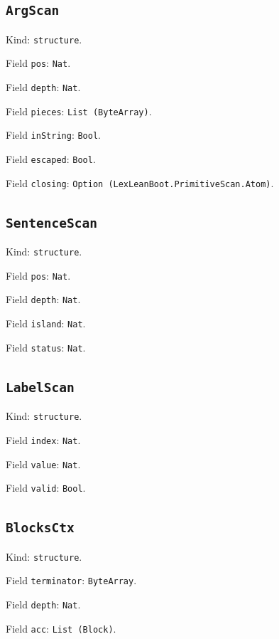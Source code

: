 \documentclass[11pt]{article}
\begin{document}
\subsection*{\texttt{ArgScan}}
\noindent Kind: \texttt{structure}.\par
\noindent Field \texttt{pos}: \texttt{Nat}.\par
\noindent Field \texttt{depth}: \texttt{Nat}.\par
\noindent Field \texttt{pieces}: \texttt{List (ByteArray)}.\par
\noindent Field \texttt{inString}: \texttt{Bool}.\par
\noindent Field \texttt{escaped}: \texttt{Bool}.\par
\noindent Field \texttt{closing}: \texttt{Option (LexLeanBoot.PrimitiveScan.Atom)}.\par
\subsection*{\texttt{SentenceScan}}
\noindent Kind: \texttt{structure}.\par
\noindent Field \texttt{pos}: \texttt{Nat}.\par
\noindent Field \texttt{depth}: \texttt{Nat}.\par
\noindent Field \texttt{island}: \texttt{Nat}.\par
\noindent Field \texttt{status}: \texttt{Nat}.\par
\subsection*{\texttt{LabelScan}}
\noindent Kind: \texttt{structure}.\par
\noindent Field \texttt{index}: \texttt{Nat}.\par
\noindent Field \texttt{value}: \texttt{Nat}.\par
\noindent Field \texttt{valid}: \texttt{Bool}.\par
\subsection*{\texttt{BlocksCtx}}
\noindent Kind: \texttt{structure}.\par
\noindent Field \texttt{terminator}: \texttt{ByteArray}.\par
\noindent Field \texttt{depth}: \texttt{Nat}.\par
\noindent Field \texttt{acc}: \texttt{List (Block)}.\par
\end{document}
